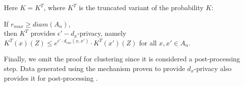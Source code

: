 Here $K = K^T$, where $K^T$ is the truncated variant of the probability $K$:
\begin{theorem}
    If $r_{max} \geq diam(A_n)$, \\
    then $K^T$ provides $\epsilon'-d_x$-privacy, namely \\
    $K^T(x)(Z) \leq e^{\epsilon' \cdot d_{euc} (x, x')} \cdot K^T(x')(Z)$  for all $x, x' \in A_n$. 
\end{theorem}

Finally, we omit the proof for clustering since it is considered a post-processing step. Data generated using the mechanism proven to provide $d_x$-privacy also provides it for post-processing \citep{feyisetan_leveraging_2019}. 
\newpage
